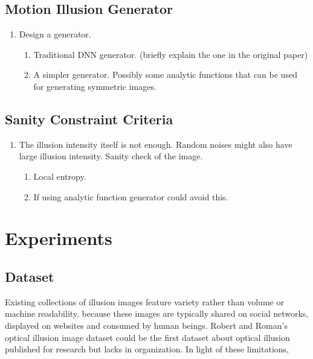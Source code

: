 \documentclass[journal]{IEEEtran}
\begin{document}
\subsection{Motion Illusion Generator}
\label{sec:generation_generator}
\begin{enumerate}
  \item Design a generator. \begin{enumerate}
    \item Traditional DNN generator. (briefly explain the one in the original paper)
    \item A simpler generator. Possibly some analytic functions that can be used for generating symmetric images.
  \end{enumerate}
\end{enumerate}

\subsection{Sanity Constraint Criteria}
\label{sec:generation_criteria}
\begin{enumerate}
  \item The illusion intensity itself is not enough. Random noises might also have large illusion intensity. Sanity check of the image. \begin{enumerate}
    \item Local entropy.
    \item If using analytic function generator could avoid this.
  \end{enumerate}
\end{enumerate}

\section{Experiments}
\label{sec:experiments}

\subsection{Dataset}

Existing collections of illusion images feature variety rather than volume or machine readability, because these images are typically shared on social networks, displayed on websites and consumed by human beings. Robert and Roman's optical illusion image dataset \cite{williams2018optical} could be the first dataset about optical illusion published for research but lacks in organization. In light of these limitations,
\end{document}

